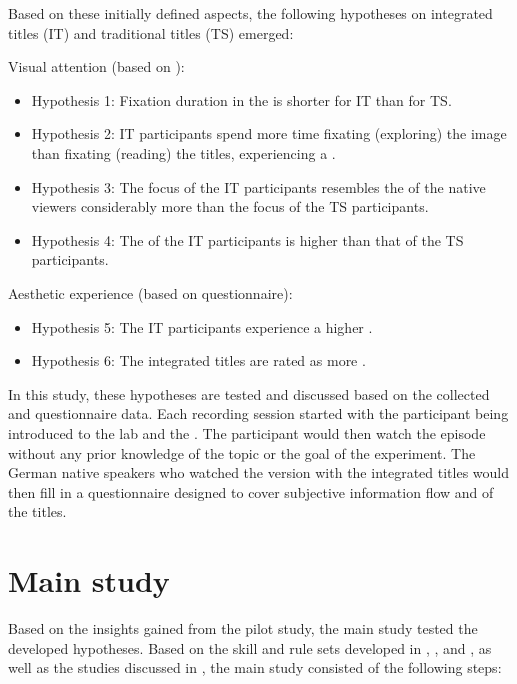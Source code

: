 \newpage 
Based on these initially defined aspects, the following hypotheses on integrated titles (IT) and traditional titles (TS) emerged:

\bigskip
Visual attention (based on ):

\begin{itemize}
\item Hypothesis 1:   Fixation duration in the  is shorter for IT than for TS.
\item Hypothesis 2:   IT participants spend more time fixating (exploring) the image than fixating (reading) the titles, experiencing a .
\item Hypothesis 3:   The focus of the IT participants resembles the  of the native viewers considerably more than the focus of the TS participants.
\item Hypothesis 4:  The  of the IT participants is higher than that of the TS participants.
\end{itemize}

\bigskip
Aesthetic experience (based on questionnaire):

\begin{itemize}
\item Hypothesis 5:   The IT participants experience a higher .
\item Hypothesis 6:   The integrated titles are rated as more .
\end{itemize}

In this study, these hypotheses are tested and discussed based on the collected  and questionnaire data. Each recording session started with the participant being introduced to the  lab and the . The participant would then watch the episode without any prior knowledge of the topic or the goal of the experiment. The German native speakers who watched the version with the integrated titles would then fill in a questionnaire designed to cover subjective information flow and  of the titles.


\section{Main study}\label{sec:7.5}

Based on the insights gained from the pilot study, the main study tested the developed hypotheses. Based on the skill and rule sets developed in , , and , as well as the  studies discussed in , the main study consisted of the following steps:


